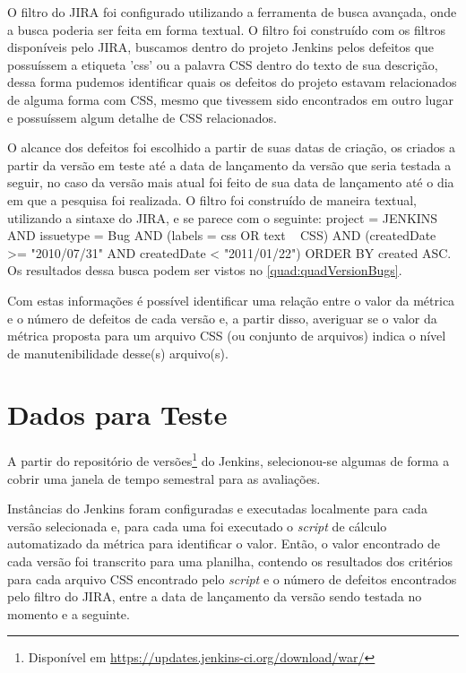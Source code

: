 O filtro do JIRA foi configurado utilizando a ferramenta de busca avançada, onde a busca poderia ser feita em forma textual. O filtro foi construído com os filtros disponíveis pelo JIRA, buscamos dentro do projeto Jenkins pelos defeitos que possuíssem a etiqueta 'css' ou a palavra CSS dentro do texto de sua descrição, dessa forma pudemos identificar quais os defeitos do projeto estavam relacionados de alguma forma com CSS, mesmo que tivessem sido encontrados em outro lugar e possuíssem algum detalhe de CSS relacionados.

O alcance dos defeitos foi escolhido a partir de suas datas de criação, os criados a partir da versão em teste até a data de lançamento da versão que seria testada a seguir, no caso da versão mais atual foi feito de sua data de lançamento até o dia em que a pesquisa foi realizada. O filtro foi construído de maneira textual, utilizando a sintaxe do JIRA, e se parece com o seguinte: project = JENKINS AND issuetype = Bug AND (labels = css OR text ~ CSS) AND (createdDate >= "2010/07/31" AND createdDate < "2011/01/22") ORDER BY created ASC. Os resultados dessa busca podem ser vistos no \autoref{quad:quadVersionBugs}.

Com estas informações é possível identificar uma relação entre o valor da métrica e o número de defeitos de cada versão e, a partir disso, averiguar se o valor da métrica proposta para um arquivo CSS (ou conjunto de arquivos) indica o nível de manutenibilidade desse(s) arquivo(s).

\section{Dados para Teste}

A partir do repositório de versões\footnote{Disponível em \url{https://updates.jenkins-ci.org/download/war/}} do Jenkins, selecionou-se algumas de forma a cobrir uma janela de tempo semestral para as avaliações.

Instâncias do Jenkins foram configuradas e executadas localmente para cada versão selecionada e, para cada uma foi executado o \textit{script} de cálculo automatizado da métrica para identificar o valor. Então, o valor encontrado de cada versão foi transcrito para uma planilha, contendo os resultados dos critérios para cada arquivo CSS encontrado pelo \textit{script} e o número de defeitos encontrados pelo filtro do JIRA, entre a data de lançamento da versão sendo testada no momento e a seguinte.


